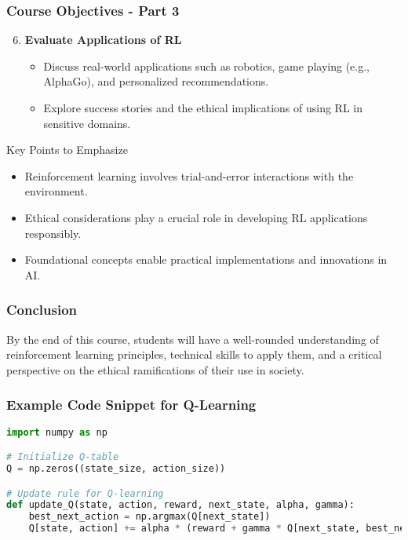 \documentclass[aspectratio=169]{beamer}
\begin{document}
\begin{frame}[fragile]
    \frametitle{Course Objectives - Part 3}
    \begin{enumerate}
        \setcounter{enumi}{5} %
        \item \textbf{Evaluate Applications of RL}
        \begin{itemize}
            \item Discuss real-world applications such as robotics, game playing (e.g., AlphaGo), and personalized recommendations.
            \item Explore success stories and the ethical implications of using RL in sensitive domains.
        \end{itemize}
    \end{enumerate}

    \begin{block}{Key Points to Emphasize}
        \begin{itemize}
            \item Reinforcement learning involves trial-and-error interactions with the environment.
            \item Ethical considerations play a crucial role in developing RL applications responsibly.
            \item Foundational concepts enable practical implementations and innovations in AI.
        \end{itemize}
    \end{block}
\end{frame}

\begin{frame}[fragile]
    \frametitle{Conclusion}
    By the end of this course, students will have a well-rounded understanding of reinforcement learning principles, technical skills to apply them, and a critical perspective on the ethical ramifications of their use in society.
\end{frame}

\begin{frame}[fragile]
    \frametitle{Example Code Snippet for Q-Learning}
    \begin{lstlisting}[language=Python]
import numpy as np

# Initialize Q-table
Q = np.zeros((state_size, action_size))

# Update rule for Q-learning
def update_Q(state, action, reward, next_state, alpha, gamma):
    best_next_action = np.argmax(Q[next_state])    
    Q[state, action] += alpha * (reward + gamma * Q[next_state, best_next_action] - Q[state, action])
    \end{lstlisting}
\end{frame}
\end{document}
